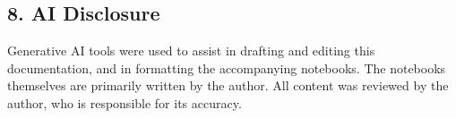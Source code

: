 \documentclass[
  11pt,
]{article}
\begin{document}
\subsection{8. AI Disclosure}\label{ai-disclosure}

Generative AI tools were used to assist in drafting and editing this
documentation, and in formatting the accompanying notebooks. The
notebooks themselves are primarily written by the author. All content
was reviewed by the author, who is responsible for its accuracy.
\end{document}
